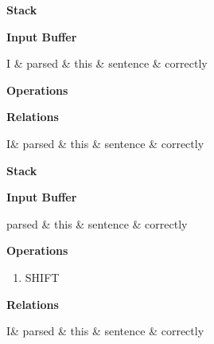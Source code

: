 \begin{multicols}{2}

	\textbf{Stack}

	\vspace{1cm}

	\begin{drawstack}
	\end{drawstack}
	\columnbreak
	
	\textbf{Input Buffer}

\begin{dependency}
	\begin{deptext}[column sep=0.2cm]
      I \& parsed \& this \& sentence \& correctly \\
   \end{deptext}
\end{dependency}

	\textbf{Operations}

	
\end{multicols}
\begin{center}
	\textbf{Relations}

\begin{dependency}
	\begin{deptext}[column sep=0.2cm]
		I\& parsed \& this \& sentence \& correctly \\
   \end{deptext}
\end{dependency}
\end{center}
\pagebreak

\begin{multicols}{2}

	\textbf{Stack}

	\vspace{1cm}

	\begin{drawstack}
		\cell{I}
	\end{drawstack}
	\columnbreak
	
	\textbf{Input Buffer}

\begin{dependency}
	\begin{deptext}[column sep=0.2cm]
       parsed \& this \& sentence \& correctly \\
   \end{deptext}
\end{dependency}

	\textbf{Operations}
	\begin{enumerate}
		\item SHIFT
	\end{enumerate}
	
\end{multicols}
\begin{center}
	\textbf{Relations}

\begin{dependency}
	\begin{deptext}[column sep=0.2cm]
		I\& parsed \& this \& sentence \& correctly \\
   \end{deptext}
\end{dependency}
\end{center}

